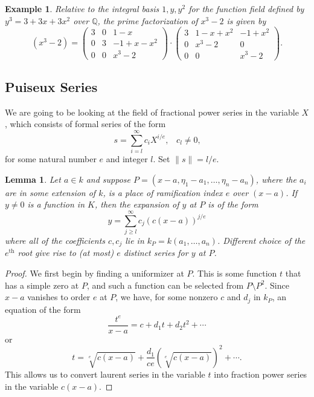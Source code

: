 \documentclass[12pt,reqno]{amsart}
\numberwithin{equation}{section}
\newtheorem{lemma}[theorem]{Lemma}
\newtheorem{example}[theorem]{Example}
\newcommand{\bbQ}[0]  { \mathbb{Q}}
\begin{document}
\begin{example}
 Relative to the integral basis $1,y,y^2$ for the function field defined by $y^3=3+3x+3x^2$ over $\bbQ$, the prime factorization of $x^3-2$ is given by
\begin{equation*}
 (x^3-2) = \left(\begin{array}{ccc}
             3 & 0 & 1-x \\
             0 & 3 & -1+x-x^2 \\
             0 & 0 & x^3-2
            \end{array}\right) \cdot
\left(\begin{array}{ccc}
             3 & 1-x+x^2 & -1+x^2 \\
             0 & x^3-2 & 0 \\
             0 & 0 & x^3-2
            \end{array}\right)\text{.}
\end{equation*}
\end{example}


\subsection{Puiseux Series}
We are going to be looking at the field of fractional power series in the variable $X$, which consists of formal series of the form
\begin{equation*}
s= \sum_{i=l}^{\infty} c_i X^{i/e}\text{,} \quad c_l \ne 0\text{,}
\end{equation*}
for some natural number $e$ and integer $l$. Set $\lVert s\rVert=l/e$.

\begin{lemma}
\label{lemma_ps}
 Let $a \in k$ and suppose $P=(x-a,\eta_1-a_1,\dots,\eta_n-a_n)$, where the $a_i$ are in some extension of $k$, is a place of ramification index $e$ over $(x-a)$. If $y\ne0$ is a function in $K$, then the expansion of $y$ at $P$ is of the form
\begin{equation*}
 y = \sum_{j \ge l}^{\infty} c_j (c(x-a))^{j/e}
\end{equation*}
where all of the coefficients $c,c_j$ lie in $k_P=k(a_1,\dots,a_n)$. Different choice of the $e^{\text{th}}$ root give rise to (at most) $e$ distinct series for $y$ at $P$.
\end{lemma}

\begin{proof}
We first begin by finding a uniformizer at $P$. This is some function $t$ that has a simple zero at $P$, and such a function can be selected from $P \setminus P^2$. Since $x-a$ vanishes to order $e$ at $P$, we have, for some nonzero $c$ and $d_j$ in $k_P$, an equation of the form
\begin{equation*}
 \frac{t^e}{x-a} = c +d_1 t+ d_2 t^2 + \cdots
\end{equation*}
or
\begin{equation*}
t = \sqrt[e]{c(x-a)} +\frac{d_1}{c e} (\sqrt[e]{c(x-a)})^2 + \cdots\text{.}
\end{equation*}
This allows us to convert laurent series in the variable $t$ into fraction power series in the variable $c(x-a)$.
\end{proof}
\end{document}
